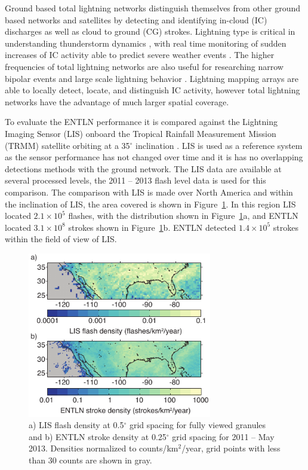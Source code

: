 Ground based total lightning networks distinguish themselves from other ground based networks and satellites by detecting and identifying in-cloud (IC) discharges as well as cloud to ground (CG) strokes.
Lightning type is critical in understanding thunderstorm dynamics \citep{Williams1989}, with real time monitoring of sudden increases of IC activity able to predict severe weather events \citep{Rudlosky2013, Darden2010, Metzger2013, Schultz2009, Schultz2011}.
The higher frequencies of total lightning networks are also useful for researching narrow bipolar events \citep{Suszcynsky2003} and large scale lightning behavior \citep{Hutchins2013}.
Lightning mapping arrays are able to locally detect, locate, and distinguish IC activity, however total lightning networks have the advantage of much larger spatial coverage.

To evaluate the ENTLN performance it is compared against the Lightning Imaging Sensor (LIS) onboard the Tropical Rainfall Measurement Mission (TRMM) satellite orbiting at a 35$^\circ$ inclination \citep{Christian1999}.
LIS is used as a reference system as the sensor performance has not changed over time and it is has no overlapping detections methods with the ground network. 
The LIS data are available at several processed levels, the 2011 -- 2013 flash level data is used for this comparison.
The comparison with LIS is made over North America and within the inclination of LIS, the area covered is shown in Figure~\ref{entln_lis:fig:density}.
In this region LIS located $2.1\times10^5$ flashes, with the distribution shown in Figure~\ref{entln_lis:fig:density}a, and ENTLN located $3.1\times10^8$ strokes shown in Figure~\ref{entln_lis:fig:density}b.
ENTLN detected $1.4\times10^5$ strokes within the field of view of LIS.

\begin{figure}[t]
   \centering
   \noindent\includegraphics[width=19pc,angle=0]{entln_lis/Figures/density.pdf}
   \caption{a) LIS flash density at 0.5$^\circ$ grid spacing for fully viewed granules and
   		b) ENTLN stroke density at 0.25$^\circ$ grid spacing for 2011 -- May 2013.
   		Densities normalized to counts/km$^2$/year, grid points with less than 30 counts are shown in gray.}
   \label{entln_lis:fig:density}
\end{figure}

